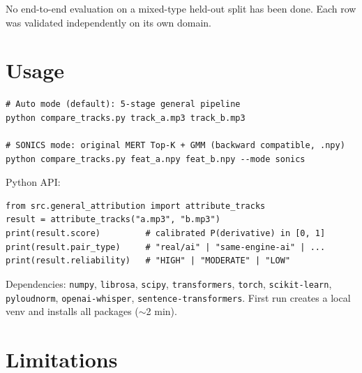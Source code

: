\documentclass[10pt,a4paper]{article}
\begin{document}
No end-to-end evaluation on a mixed-type held-out split has been done.
Each row was validated independently on its own domain.

\section{Usage}

\begin{verbatim}
# Auto mode (default): 5-stage general pipeline
python compare_tracks.py track_a.mp3 track_b.mp3

# SONICS mode: original MERT Top-K + GMM (backward compatible, .npy)
python compare_tracks.py feat_a.npy feat_b.npy --mode sonics
\end{verbatim}

Python API:
\begin{verbatim}
from src.general_attribution import attribute_tracks
result = attribute_tracks("a.mp3", "b.mp3")
print(result.score)         # calibrated P(derivative) in [0, 1]
print(result.pair_type)     # "real/ai" | "same-engine-ai" | ...
print(result.reliability)   # "HIGH" | "MODERATE" | "LOW"
\end{verbatim}

Dependencies: \texttt{numpy}, \texttt{librosa}, \texttt{scipy},
\texttt{transformers}, \texttt{torch}, \texttt{scikit-learn},
\texttt{pyloudnorm}, \texttt{openai-whisper}, \texttt{sentence-transformers}.
First run creates a local venv and installs all packages ($\sim$2 min).

\section{Limitations}
\end{document}
